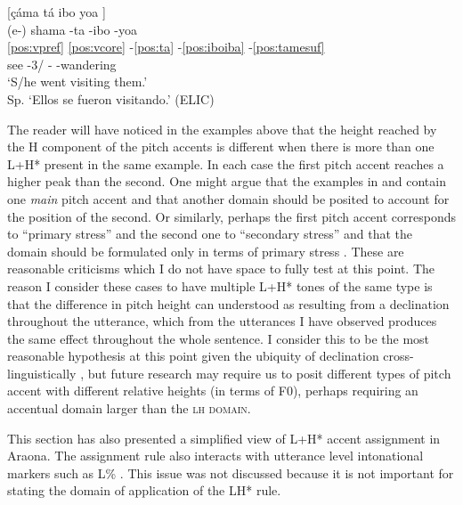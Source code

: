 \documentclass[output=paper,hidelinks]{langscibook}
\begin{document}
\ea \label{ex:shamataiboyoa}
	[çáma tá ibo yoa \downarrow] \\	
	\glll (e-) shama -ta -ibo -yoa \\
    \ref{pos:vpref} \ref{pos:vcore} -\ref{pos:ta} -\ref{pos:iboiba} -\ref{pos:tamesuf} \\
    \E{} see -3\Aarg{}/\Tpl{} -\Final{} -wandering   \\ 
	\glt `S/he went visiting them.' \\ Sp. `Ellos se fueron visitando.' \hfill (ELIC)
\z

The reader will have noticed in the examples above that the height reached by the H component of the pitch accents is different when there is more than one L+H* present in the same example. In each case the first pitch accent reaches a higher peak than the second. One might argue that the examples in  and  contain one \textit{main} pitch accent and that another domain should be posited to account for the position of the second. Or similarly, perhaps the first pitch accent corresponds to ``primary stress'' and the second one to ``secondary stress'' and that the domain should be formulated only in terms of primary stress \citep{emkow:2006:araona}. These are reasonable criticisms which I do not have space to fully test at this point. The reason I consider these cases to have multiple L+H* tones of the same type is that the difference in pitch height can understood as resulting from a declination throughout the utterance, which from the utterances I have observed produces the same effect throughout the whole sentence. I consider this to be the most reasonable hypothesis at this point given the ubiquity of declination cross-linguistically \citep{ladd2008}, but future research may require us to posit different types of pitch accent with different relative heights (in terms of F0), perhaps requiring an accentual domain larger than the \textsc{lh domain}.

This section has also presented a simplified view of L+H* accent assignment in Araona. The assignment rule also interacts with utterance level intonational markers such as L\% \citep{tallmangallinate}. This issue was not discussed because it is not important for stating the domain of application of the LH* rule.


\end{document}
